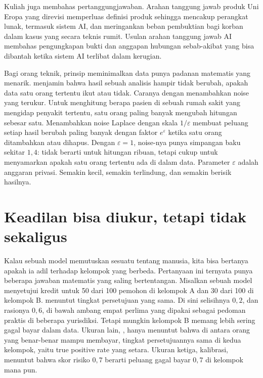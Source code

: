 Kuliah juga membahas pertanggungjawaban. Arahan tanggung jawab produk Uni Eropa yang direvisi memperluas
definisi produk sehingga mencakup perangkat lunak, termasuk sistem AI, dan meringankan beban pembuktian
bagi korban dalam kasus yang secara teknis rumit. Usulan arahan tanggung jawab AI membahas pengungkapan
bukti dan anggapan hubungan sebab-akibat yang bisa dibantah ketika sistem AI terlibat dalam kerugian.

Bagi orang teknik, prinsip meminimalkan data punya padanan matematis yang menarik. 
\citep{dwork2006} menjamin bahwa hasil sebuah analisis hampir tidak berubah, apakah data satu orang tertentu ikut atau
tidak. Caranya dengan menambahkan noise yang terukur. Untuk menghitung berapa pasien di sebuah rumah sakit yang
mengidap penyakit tertentu, satu orang paling banyak mengubah hitungan sebesar satu. Menambahkan noise Laplace dengan
skala $1/\varepsilon$ membuat peluang setiap hasil berubah paling banyak dengan faktor $e^\varepsilon$ ketika satu
orang ditambahkan atau dihapus. Dengan $\varepsilon=1$, noise-nya punya simpangan baku sekitar $1{,}4$: tidak berarti
untuk hitungan ribuan, tetapi cukup untuk menyamarkan apakah satu orang tertentu ada di dalam data. Parameter
$\varepsilon$ adalah anggaran privasi. Semakin kecil, semakin terlindung, dan semakin berisik hasilnya.

\section{Keadilan bisa diukur, tetapi tidak sekaligus}

Kalau sebuah model memutuskan sesuatu tentang manusia, kita bisa bertanya apakah ia adil terhadap kelompok yang
berbeda. Pertanyaan ini ternyata punya beberapa jawaban matematis yang saling bertentangan. Misalkan sebuah model
menyetujui kredit untuk 50 dari 100 pemohon di kelompok A dan 30 dari 100 di kelompok B. 
menuntut tingkat persetujuan yang sama. Di sini selisihnya $0{,}2$, dan rasionya $0{,}6$, di bawah ambang empat perlima
yang dipakai sebagai pedoman praktis di beberapa yurisdiksi. Tetapi mungkin kelompok B memang lebih sering gagal
bayar dalam data. Ukuran lain,  \citep{hardt2016}, hanya menuntut bahwa di antara orang yang
benar-benar mampu membayar, tingkat persetujuannya sama di kedua kelompok, yaitu true positive rate yang setara.
Ukuran ketiga, kalibrasi, menuntut bahwa skor risiko $0{,}7$ berarti peluang gagal bayar $0{,}7$ di kelompok mana pun.


